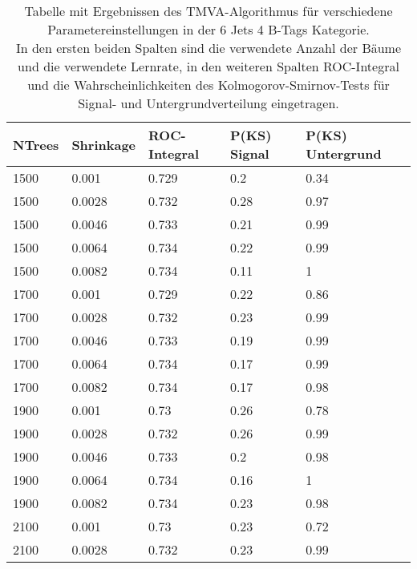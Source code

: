 \begin{table}[tbp]\parbox{12cm}{
  \caption[TMVA 6j4t Ergebnisse]{Tabelle mit Ergebnissen des TMVA-Algorithmus f\"ur verschiedene Parametereinstellungen in der 6 Jets 4 B-Tags Kategorie.\\In den ersten beiden Spalten sind die verwendete Anzahl der B\"aume und die verwendete Lernrate, in den weiteren Spalten ROC-Integral und die Wahrscheinlichkeiten des Kolmogorov-Smirnov-Tests f\"ur Signal- und Untergrundverteilung eingetragen.}%
  }\label{tab:tmva_6j4t}
  \begin{center}
  \begin{tabular}{lllll}
  \hline
  NTrees & Shrinkage & ROC-Integral & P(KS) Signal & P(KS) Untergrund\\
  \hline
 \num{1500}  & \num{0,001}   & \num{0,729} & \num{0,2}  & \num{0,34}\\
 \num{1500}  & \num{0,0028}  & \num{0,732} & \num{0,28} & \num{0,97}\\
 \num{1500}  & \num{0,0046}  & \num{0,733} & \num{0,21} & \num{0,99}\\
 \num{1500}  & \num{0,0064}  & \num{0,734} & \num{0,22} & \num{0,99}\\
 \num{1500}  & \num{0,0082}  & \num{0,734} & \num{0,11} & \num{1}\\
 \num{1700}  & \num{0,001}   & \num{0,729} & \num{0,22} & \num{0,86}\\
 \num{1700}  & \num{0,0028}  & \num{0,732} & \num{0,23} & \num{0,99}\\
 \num{1700}  & \num{0,0046}  & \num{0,733} & \num{0,19} & \num{0,99}\\
 \num{1700}  & \num{0,0064}  & \num{0,734} & \num{0,17} & \num{0,99}\\
 \num{1700}  & \num{0,0082}  & \num{0,734} & \num{0,17} & \num{0,98}\\
 \num{1900}  & \num{0,001}   & \num{0,73}  & \num{0,26} & \num{0,78}\\
 \num{1900}  & \num{0,0028}  & \num{0,732} & \num{0,26} & \num{0,99}\\
 \num{1900}  & \num{0,0046}  & \num{0,733} & \num{0,2}  & \num{0,98}\\
 \num{1900}  & \num{0,0064}  & \num{0,734} & \num{0,16} & \num{1}\\
 \num{1900}  & \num{0,0082}  & \num{0,734} & \num{0,23} & \num{0,98}\\
 \num{2100}  & \num{0,001}   & \num{0,73}  & \num{0,23} & \num{0,72}\\
 \num{2100}  & \num{0,0028}  & \num{0,732} & \num{0,23} & \num{0,99}\\

\end{tabular}
\end{center}
\end{table}
